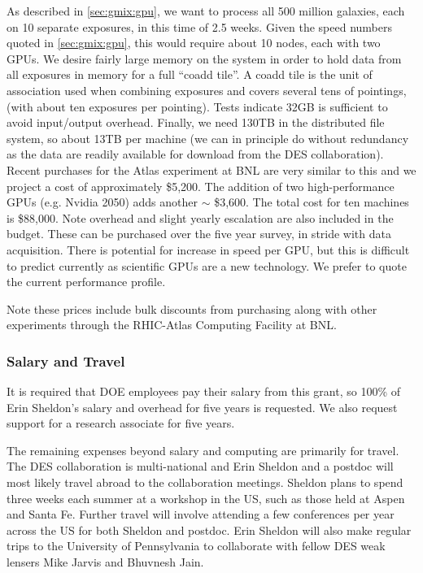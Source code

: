 \documentclass[12pt]{article}
\begin{document}
As described in \ref{sec:gmix:gpu}, we want to process all 500 million
galaxies, each on 10 separate exposures, in this time of 2.5 weeks. Given the
speed numbers quoted in \ref{sec:gmix:gpu}, this would require about 10 nodes,
each with two GPUs.  
We desire fairly large memory on the system in order to hold data from all
exposures in memory for a full ``coadd tile''. A coadd tile is the unit of
association used when combining exposures and covers several tens of pointings,
(with about ten exposures per pointing).  Tests indicate 32GB is sufficient to
avoid input/output overhead.  Finally, we need 130TB in the distributed file
system, so about 13TB per machine (we can in principle do without redundancy as
the data are readily available for download from the DES collaboration).
Recent purchases for the Atlas experiment at BNL are very similar to this and
we project a cost of approximately \$5,200.  The addition of two
high-performance GPUs (e.g. Nvidia 2050) adds another $\sim$ \$3,600.  The
total cost for ten machines is \$88,000.  Note overhead and slight yearly
escalation are also included in the budget.  These can be purchased over the
five year survey, in stride with data acquisition.  There is potential for
increase in speed per GPU, but this is difficult to predict currently as
scientific GPUs are a new technology.  We prefer to quote the current
performance profile.

Note these prices include bulk discounts from purchasing along with other
experiments through the RHIC-Atlas Computing Facility at BNL.  



\subsubsection{Salary and Travel}

It is required that DOE employees pay their salary from this grant, so 100\% of
Erin Sheldon's salary and overhead for five years is requested.  We also request
support for a research associate for five years.

The remaining expenses beyond salary and computing are primarily for travel.
The DES collaboration is multi-national and Erin Sheldon and a postdoc will
most likely travel abroad to the collaboration meetings.  Sheldon plans to
spend three weeks each summer at a workshop in the US, such as those held at
Aspen and Santa Fe.  Further travel will involve attending a few conferences
per year across the US for both Sheldon and postdoc.  Erin Sheldon will also
make regular trips to the University of Pennsylvania to collaborate with fellow
DES weak lensers Mike Jarvis and Bhuvnesh Jain.
\end{document}
